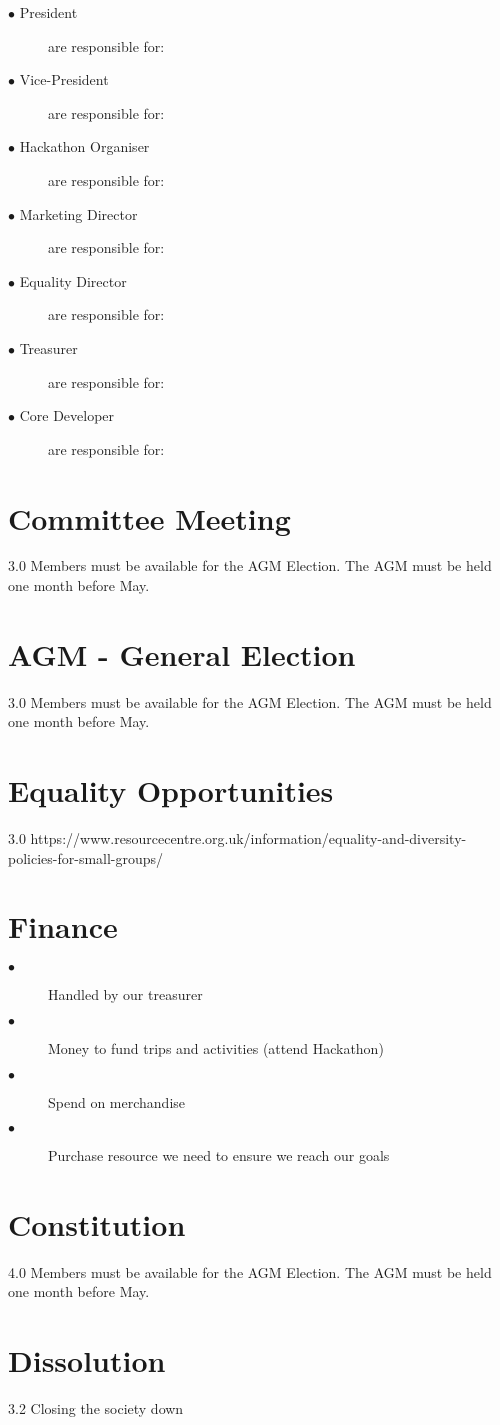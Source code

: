 \documentclass{article}
\begin{document}
\begin{description}
  \item[$\bullet$ President] are responsible for: 
  \item[$\bullet$ Vice-President] are responsible for: 
  \item[$\bullet$ Hackathon Organiser] are responsible for: 
  \item[$\bullet$ Marketing Director] are responsible for: 
  \item[$\bullet$ Equality Director] are responsible for: 
  \item[$\bullet$ Treasurer] are responsible for: 
  \item[$\bullet$ Core Developer] are responsible for: 
\end{description}

\section{Committee Meeting}
3.0 Members must be available for the AGM Election. The AGM must be held one month before May.

\section{AGM - General Election}
3.0 Members must be available for the AGM Election. The AGM must be held one month before May.


\section{Equality Opportunities}
3.0 https://www.resourcecentre.org.uk/information/equality-and-diversity-policies-for-small-groups/

\section{Finance}
\begin{description}
  \item[$\bullet$] Handled by our treasurer
  \item[$\bullet$] Money to fund trips and activities (attend Hackathon)
  \item[$\bullet$] Spend on merchandise
  \item[$\bullet$] Purchase resource we need to ensure we reach our goals
\end{description}

\section{Constitution}
4.0 Members must be available for the AGM Election. The AGM must be held one month before May.


\section{Dissolution}
3.2 Closing the society down
\end{document}
